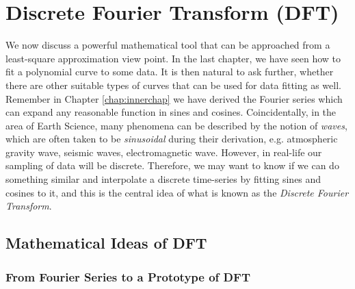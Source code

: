 \chapter{Discrete Fourier Transform (DFT)}
We now discuss a powerful mathematical tool that can be approached from a least-square approximation view point. In the last chapter, we have seen how to fit a polynomial curve to some data. It is then natural to ask further, whether there are other suitable types of curves that can be used for data fitting as well. Remember in Chapter \ref{chap:innerchap} we have derived the Fourier series which can expand any reasonable function in sines and cosines. Coincidentally, in the area of Earth Science, many phenomena can be described by the notion of \textit{waves}, which are often taken to be \textit{sinusoidal} during their derivation, e.g. atmospheric gravity wave, seismic waves, electromagnetic wave. However, in real-life our sampling of data will be discrete. Therefore, we may want to know if we can do something similar and interpolate a discrete time-series by fitting sines and cosines to it, and this is the central idea of what is known as the \textit{Discrete Fourier Transform}.

\section{Mathematical Ideas of DFT}

\subsection{From Fourier Series to a Prototype of DFT}

